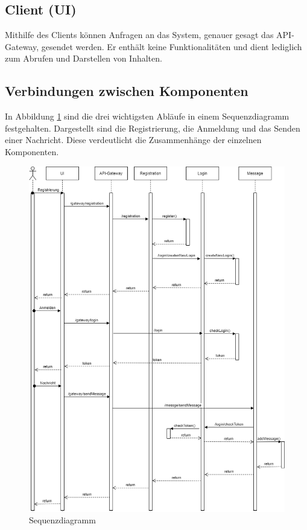 \subsection{Client (UI)}
Mithilfe des Clients können Anfragen an das System, genauer gesagt das API-Gateway, gesendet werden. Er enthält keine Funktionalitäten und dient lediglich zum Abrufen und Darstellen von Inhalten.

\subsection{Verbindungen zwischen Komponenten}
In Abbildung \ref{sequenz} sind die drei wichtigsten Abläufe in einem Sequenzdiagramm festgehalten. Dargestellt sind die Registrierung, die Anmeldung und das Senden einer Nachricht. Diese verdeutlicht die Zusammenhänge der einzelnen Komponenten.\newpage
\begin{figure}[!htp] 
	\centering
	\includegraphics[width=1.0\textwidth]{Graphics/test2.png}
	\caption{Sequenzdiagramm}
	\label{sequenz}
\end{figure}

